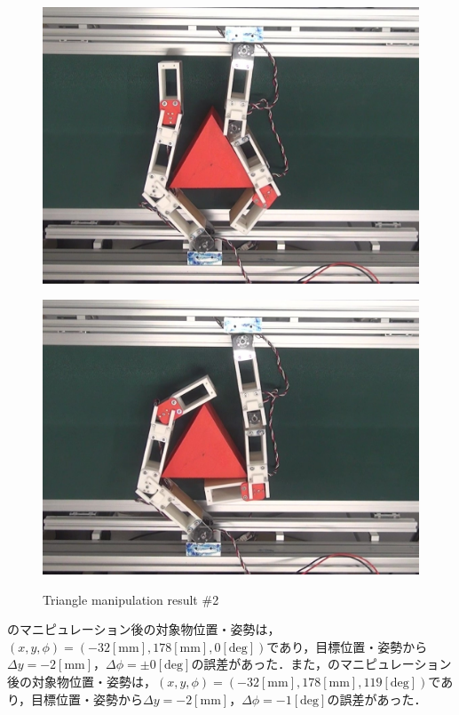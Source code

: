 \documentclass[a4paper,twoside,12pt,papersize, dvipdfmx]{iirthesis}
\begin{document}
\begin{figure}[hbt]
\begin{minipage}{0.249\hsize}
\includegraphics[width=0.98\hsize]{fig/4-manipulation-result/Triangle/2-3.jpg}
\subcaption{}\label{}
\end{minipage}\hfill
\begin{minipage}{0.249\hsize}
\centering
\includegraphics[width=0.98\hsize]{fig/4-manipulation-result/Triangle/2-4.jpg}
\subcaption{}\label{}
\end{minipage}
\caption{Triangle manipulation result \#2}\label{fig::result::trim2}
\end{figure}

のマニピュレーション後の対象物位置・姿勢は，$(x, y, \phi) = (-32 \mathrm{[mm]}, 178 \mathrm{[mm]}, 0 \mathrm{[deg]})$であり，目標位置・姿勢から$\Delta y = -2 \mathrm{[mm]}$，$\Delta \phi = \pm 0 \mathrm{[deg]}$の誤差があった．また，のマニピュレーション後の対象物位置・姿勢は，$(x, y, \phi) = (-32 \mathrm{[mm]}, 178 \mathrm{[mm]}, 119 \mathrm{[deg]})$であり，目標位置・姿勢から$\Delta y = -2 \mathrm{[mm]}$，$\Delta \phi = -1 \mathrm{[deg]}$の誤差があった．\par
\end{document}
